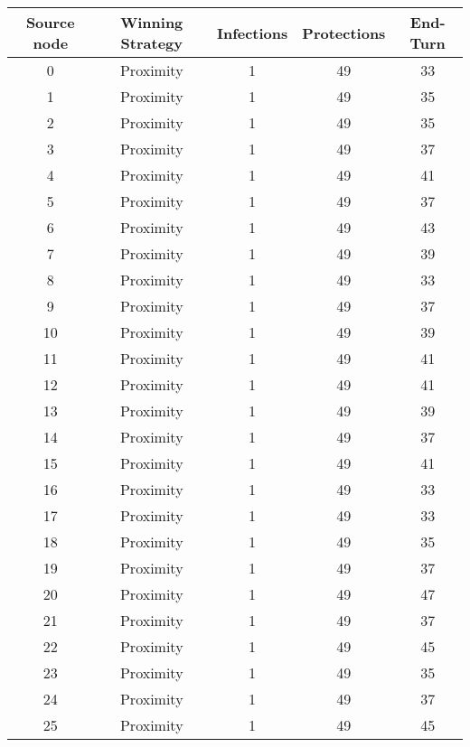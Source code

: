 \documentclass[results.tex]{subfiles}
\begin{document}
\begin{center}
  \begin{tabular}{| c || c | c | c | c |}
    \hline
    {\bfseries Source node} & {\bfseries Winning Strategy} & {\bfseries Infections} & {\bfseries Protections} & {\bfseries End-Turn} \\  %
    \hline\hline
    0 & Proximity & 1 & 49 & 33 \\ 
    \hline
    1 & Proximity & 1 & 49 & 35 \\ 
    \hline
    2 & Proximity & 1 & 49 & 35 \\ 
    \hline
    3 & Proximity & 1 & 49 & 37 \\ 
    \hline
    4 & Proximity & 1 & 49 & 41 \\ 
    \hline
    5 & Proximity & 1 & 49 & 37 \\ 
    \hline
    6 & Proximity & 1 & 49 & 43 \\ 
    \hline
    7 & Proximity & 1 & 49 & 39 \\ 
    \hline
    8 & Proximity & 1 & 49 & 33 \\ 
    \hline
    9 & Proximity & 1 & 49 & 37 \\ 
    \hline
    10 & Proximity & 1 & 49 & 39 \\ 
    \hline
    11 & Proximity & 1 & 49 & 41 \\ 
    \hline
    12 & Proximity & 1 & 49 & 41 \\ 
    \hline
    13 & Proximity & 1 & 49 & 39 \\ 
    \hline
    14 & Proximity & 1 & 49 & 37 \\ 
    \hline
    15 & Proximity & 1 & 49 & 41 \\ 
    \hline
    16 & Proximity & 1 & 49 & 33 \\ 
    \hline
    17 & Proximity & 1 & 49 & 33 \\ 
    \hline
    18 & Proximity & 1 & 49 & 35 \\ 
    \hline
    19 & Proximity & 1 & 49 & 37 \\ 
    \hline
    20 & Proximity & 1 & 49 & 47 \\ 
    \hline
    21 & Proximity & 1 & 49 & 37 \\ 
    \hline
    22 & Proximity & 1 & 49 & 45 \\ 
    \hline
    23 & Proximity & 1 & 49 & 35 \\ 
    \hline
    24 & Proximity & 1 & 49 & 37 \\ 
    \hline
    25 & Proximity & 1 & 49 & 45 \\ 

\end{tabular}
\end{center}
\end{document}
